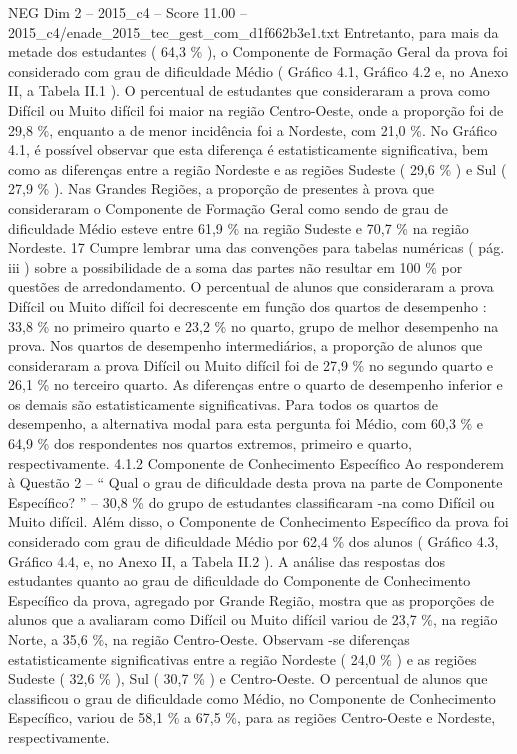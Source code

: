\begin{textsample}{NEG Dim 2 – 2015\_c4 – Score 11.00 – 2015\_c4/enade\_2015\_tec\_gest\_com\_d1f662b3e1.txt}
Entretanto, para mais da metade dos estudantes ( 64,3 \% ), o Componente de Formação Geral da prova foi considerado com grau de dificuldade Médio ( Gráfico 4.1, Gráfico 4.2 e, no Anexo II, a Tabela II.1 ).
O percentual de estudantes que consideraram a prova como Difícil ou Muito difícil foi maior na região Centro-Oeste, onde a proporção foi de 29,8 \%, enquanto a de menor incidência foi a Nordeste, com 21,0 \%.
No Gráfico 4.1, é possível observar que esta diferença é estatisticamente significativa, bem como as diferenças entre a região Nordeste e as regiões Sudeste ( 29,6 \% ) e Sul ( 27,9 \% ).
Nas Grandes Regiões, a proporção de presentes à prova que consideraram o Componente de Formação Geral como sendo de grau de dificuldade Médio esteve entre 61,9 \% na região Sudeste e 70,7 \% na região Nordeste. 17 Cumpre lembrar uma das convenções para tabelas numéricas ( pág. iii ) sobre a possibilidade de a soma das partes não resultar em 100 \% por questões de arredondamento.
O percentual de alunos que consideraram a prova Difícil ou Muito difícil foi decrescente em função dos quartos de desempenho : 33,8 \% no primeiro quarto e 23,2 \% no quarto, grupo de melhor desempenho na prova.
Nos quartos de desempenho intermediários, a proporção de alunos que consideraram a prova Difícil ou Muito difícil foi de 27,9 \% no segundo quarto e 26,1 \% no terceiro quarto.
As diferenças entre o quarto de desempenho inferior e os demais são estatisticamente significativas.
Para todos os quartos de desempenho, a alternativa modal para esta pergunta foi Médio, com 60,3 \% e 64,9 \% dos respondentes nos quartos extremos, primeiro e quarto, respectivamente. 4.1.2 Componente de Conhecimento Específico Ao responderem à Questão 2 – “ Qual o grau de dificuldade desta prova na parte de Componente Específico? ” – 30,8 \% do grupo de estudantes classificaram -na como Difícil ou Muito difícil.
Além disso, o Componente de Conhecimento Específico da prova foi considerado com grau de dificuldade Médio por 62,4 \% dos alunos ( Gráfico 4.3, Gráfico 4.4, e, no Anexo II, a Tabela II.2 ).
A análise das respostas dos estudantes quanto ao grau de dificuldade do Componente de Conhecimento Específico da prova, agregado por Grande Região, mostra que as proporções de alunos que a avaliaram como Difícil ou Muito difícil variou de 23,7 \%, na região Norte, a 35,6 \%, na região Centro-Oeste.
Observam -se diferenças estatisticamente significativas entre a região Nordeste ( 24,0 \% ) e as regiões Sudeste ( 32,6 \% ), Sul ( 30,7 \% ) e Centro-Oeste.
O percentual de alunos que classificou o grau de dificuldade como Médio, no Componente de Conhecimento Específico, variou de 58,1 \% a 67,5 \%, para as regiões Centro-Oeste e Nordeste, respectivamente.

\end{textsample}
